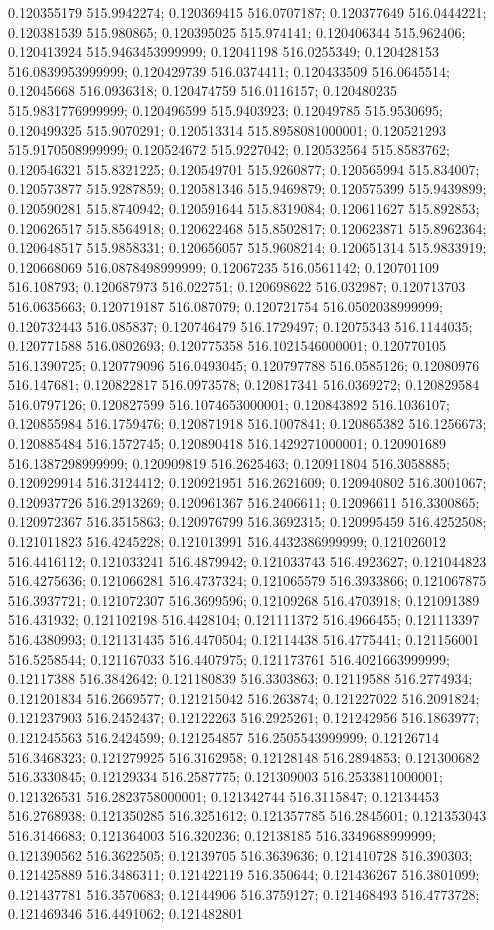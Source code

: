 0.120355179 515.9942274; 0.120369415 516.0707187; 0.120377649 516.0444221; 0.120381539 515.980865; 0.120395025 515.974141; 0.120406344 515.962406; 0.120413924 515.9463453999999; 0.12041198 516.0255349; 0.120428153 516.0839953999999; 0.120429739 516.0374411; 0.120433509 516.0645514; 0.12045668 516.0936318; 0.120474759 516.0116157; 0.120480235 515.9831776999999; 0.120496599 515.9403923; 0.12049785 515.9530695; 0.120499325 515.9070291; 0.120513314 515.8958081000001; 0.120521293 515.9170508999999; 0.120524672 515.9227042; 0.120532564 515.8583762; 0.120546321 515.8321225; 0.120549701 515.9260877; 0.120565994 515.834007; 0.120573877 515.9287859; 0.120581346 515.9469879; 0.120575399 515.9439899; 0.120590281 515.8740942; 0.120591644 515.8319084; 0.120611627 515.892853; 0.120626517 515.8564918; 0.120622468 515.8502817; 0.120623871 515.8962364; 0.120648517 515.9858331; 0.120656057 515.9608214; 0.120651314 515.9833919; 0.120668069 516.0878498999999; 0.12067235 516.0561142; 0.120701109 516.108793; 0.120687973 516.022751; 0.120698622 516.032987; 0.120713703 516.0635663; 0.120719187 516.087079; 0.120721754 516.0502038999999; 0.120732443 516.085837; 0.120746479 516.1729497; 0.12075343 516.1144035; 0.120771588 516.0802693; 0.120775358 516.1021546000001; 0.120770105 516.1390725; 0.120779096 516.0493045; 0.120797788 516.0585126; 0.12080976 516.147681; 0.120822817 516.0973578; 0.120817341 516.0369272; 0.120829584 516.0797126; 0.120827599 516.1074653000001; 0.120843892 516.1036107; 0.120855984 516.1759476; 0.120871918 516.1007841; 0.120865382 516.1256673; 0.120885484 516.1572745; 0.120890418 516.1429271000001; 0.120901689 516.1387298999999; 0.120909819 516.2625463; 0.120911804 516.3058885; 0.120929914 516.3124412; 0.120921951 516.2621609; 0.120940802 516.3001067; 0.120937726 516.2913269; 0.120961367 516.2406611; 0.12096611 516.3300865; 0.120972367 516.3515863; 0.120976799 516.3692315; 0.120995459 516.4252508; 0.121011823 516.4245228; 0.121013991 516.4432386999999; 0.121026012 516.4416112; 0.121033241 516.4879942; 0.121033743 516.4923627; 0.121044823 516.4275636; 0.121066281 516.4737324; 0.121065579 516.3933866; 0.121067875 516.3937721; 0.121072307 516.3699596; 0.12109268 516.4703918; 0.121091389 516.431932; 0.121102198 516.4428104; 0.121111372 516.4966455; 0.121113397 516.4380993; 0.121131435 516.4470504; 0.12114438 516.4775441; 0.121156001 516.5258544; 0.121167033 516.4407975; 0.121173761 516.4021663999999; 0.12117388 516.3842642; 0.121180839 516.3303863; 0.12119588 516.2774934; 0.121201834 516.2669577; 0.121215042 516.263874; 0.121227022 516.2091824; 0.121237903 516.2452437; 0.12122263 516.2925261; 0.121242956 516.1863977; 0.121245563 516.2424599; 0.121254857 516.2505543999999; 0.12126714 516.3468323; 0.121279925 516.3162958; 0.12128148 516.2894853; 0.121300682 516.3330845; 0.12129334 516.2587775; 0.121309003 516.2533811000001; 0.121326531 516.2823758000001; 0.121342744 516.3115847; 0.12134453 516.2768938; 0.121350285 516.3251612; 0.121357785 516.2845601; 0.121353043 516.3146683; 0.121364003 516.320236; 0.12138185 516.3349688999999; 0.121390562 516.3622505; 0.12139705 516.3639636; 0.121410728 516.390303; 0.121425889 516.3486311; 0.121422119 516.350644; 0.121436267 516.3801099; 0.121437781 516.3570683; 0.12144906 516.3759127; 0.121468493 516.4773728; 0.121469346 516.4491062; 0.121482801 